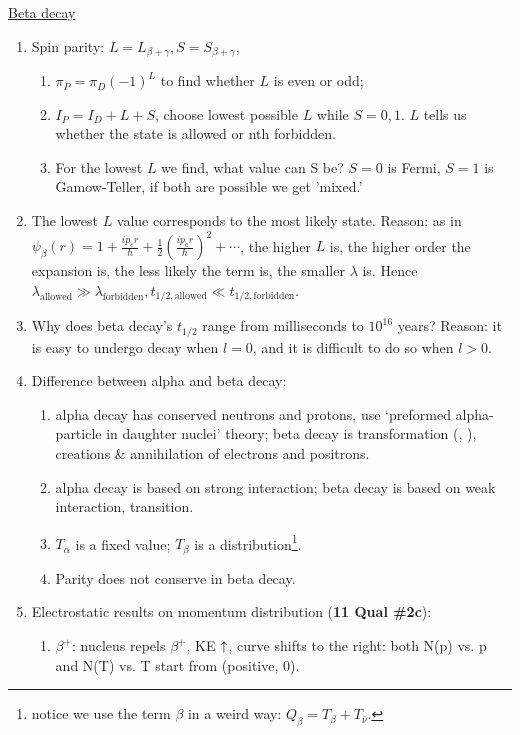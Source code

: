 \documentclass{school-22.101-notes}
\begin{document}
\uline{Beta decay}
\begin{enumerate}
\item Spin parity: $L = L_{\beta + \gamma}, S = S_{\beta + \gamma}$, 
    \begin{enumerate}
    \item $\pi_P = \pi_D (-1)^L$ to find whether $L$ is even or odd;
    \item $I_P = I_D + L + S$, choose lowest possible $L$ while $S = 0,1$. $L$ tells us whether the state is allowed or nth forbidden.
    \item For the lowest $L$ we find, what value can S be? $S=0$ is Fermi, $S=1$ is Gamow-Teller, if both are possible we get 'mixed.' 
    \end{enumerate}
\item The lowest $L$ value corresponds to the most likely state. Reason: as in $\psi_{\beta} (r) = 1 + \frac{i p_e r}{\hbar} + \frac{1}{2} \left( \frac{i p_e r}{\hbar} \right)^2 + \cdots$, the higher $L$ is, the higher order the expansion is, the less likely the term is, the smaller $\lambda$ is. Hence $\lambda_{\mathrm{allowed}} \gg \lambda_{\mathrm{forbidden}}, t_{1/2,\mathrm{allowed}} \ll t_{1/2,\mathrm{forbidden}}$. 
\item Why does beta decay's $t_{1/2}$ range from milliseconds to $10^{16}$ years? Reason: it is easy to undergo decay when $l=0$, and it is difficult to do so when $l>0$.     
\item Difference between alpha and beta decay: 
    \begin{enumerate}
    \item alpha decay has conserved neutrons and protons, use `preformed alpha-particle in daughter nuclei' theory; beta decay is transformation (, ), creations \& annihilation of electrons and positrons.
    \item alpha decay is based on strong interaction; beta decay is based on weak interaction, transition. 
    \item $T_{\alpha}$ is a fixed value; $T_{\beta}$ is a distribution\footnote{notice we use the term $\beta$ in a weird way: $Q_{\beta} = T_{\beta} + T_{\bar{\nu}}$.}. 
    \item Parity does not conserve in beta decay.
    \end{enumerate}
\item Electrostatic results on momentum distribution (\textbf{11 Qual \#2c}): 
    \begin{enumerate}
    \item $\beta^+$: nucleus repels $\beta^+$, KE $\uparrow$, curve shifts to the right: both N(p) vs. p and N(T) vs. T start from (positive, 0). 

\end{enumerate}
\end{enumerate}
\end{document}
